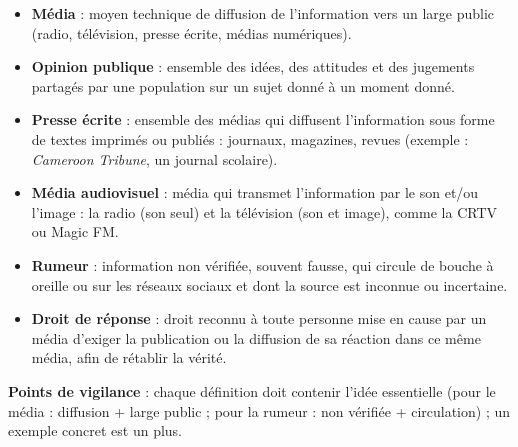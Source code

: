 \documentclass[11pt]{article}
\newcommand{\cle}[1]{{\popxbold\color{popdark}#1}}
\begin{document}
\begin{corrige}
\begin{itemize}
\item \textbf{\cle{Média}} : moyen technique de diffusion de l'information vers un large public (radio, télévision, presse écrite, médias numériques).
\item \textbf{\cle{Opinion publique}} : ensemble des idées, des attitudes et des jugements partagés par une population sur un sujet donné à un moment donné.
\item \textbf{\cle{Presse écrite}} : ensemble des médias qui diffusent l'information sous forme de textes imprimés ou publiés : journaux, magazines, revues (exemple : \emph{Cameroon Tribune}, un journal scolaire).
\item \textbf{\cle{Média audiovisuel}} : média qui transmet l'information par le son et/ou l'image : la radio (son seul) et la télévision (son et image), comme la CRTV ou Magic FM.
\item \textbf{\cle{Rumeur}} : information non vérifiée, souvent fausse, qui circule de bouche à oreille ou sur les réseaux sociaux et dont la source est inconnue ou incertaine.
\item \textbf{\cle{Droit de réponse}} : droit reconnu à toute personne mise en cause par un média d'exiger la publication ou la diffusion de sa réaction dans ce même média, afin de rétablir la vérité.
\end{itemize}
\textbf{Points de vigilance} : chaque définition doit contenir l'idée essentielle (pour le média : diffusion + large public ; pour la rumeur : non vérifiée + circulation) ; un exemple concret est un plus.
\end{corrige}
\end{document}
